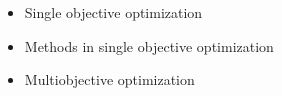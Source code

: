 \begin{itemize}
    \item Single objective optimization
    \item Methods in single objective optimization
    \item Multiobjective optimization
\end{itemize}